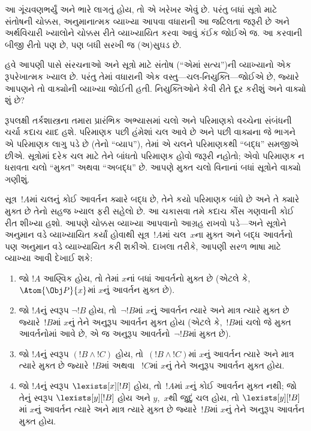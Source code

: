 આ ગૂંચવણભર્યું અને ભારે લાગતું હોય, તો એ ખરેખર એવું છે. પરંતુ બધાં
સૂત્રો માટે સંતોષની ચોક્કસ, અનુમાનાત્મક વ્યાખ્યા આપવા વધારાની આ
જટિલતા જરૂરી છે અને અર્થવિચારી ખ્યાલોને ચોક્કસ રીતે વ્યાખ્યાયિત કરવા
આવું કંઈક જોઈએ જ. આ કરવાની બીજી રીતો પણ છે, પણ બધી સરખી જ
(અ)સુઘડ છે.
\endgroup


\begingroup
\makeatletter{}\makeatother


\label{guunit:OLP-0144}


હવે આપણી પાસે સંરચનાઓ અને સૂત્રો માટે સંતોષ (``એમાં
સત્ય'')ની વ્યાખ્યાનો એક રૂપરેખાત્મક ખ્યાલ છે. પરંતુ તેમાં વધારાની એક
વસ્તુ---ચલ-નિયુક્તિ---જોઈએ છે, જ્યારે આપણને તો
વાક્યોની વ્યાખ્યા જોઈતી હતી. નિયુક્તિઓને કેવી રીતે દૂર કરીશું
અને વાક્યો શું છે?

રૂપલક્ષી તર્કશાસ્ત્રના તમારા પ્રારંભિક અભ્યાસમાં ચલો અને
પરિમાણકો વચ્ચેના સંબંધની ચર્ચા કદાચ યાદ હશે. પરિમાણક પછી હંમેશાં
ચલ આવે છે અને પછી વાક્યના જે ભાગને એ પરિમાણક લાગુ
પડે છે (તેનો ``વ્યાપ''), તેમાં એ ચલને પરિમાણકથી ``બદ્ધ''
સમજીએ છીએ. સૂત્રોમાં દરેક ચલ માટે તેને બાંધતો પરિમાણક
હોવો જરૂરી નહોતો; એવો પરિમાણક ન ધરાવતા ચલો ``મુક્ત'' અથવા
``અબદ્ધ'' છે. આપણે મુક્ત ચલો વિનાનાં બધાં સૂત્રોને
વાક્યો ગણીશું.

સૂત્ર~$!A$માં ચલનું કોઈ આવર્તન ક્યારે બદ્ધ છે, તેને
કયો પરિમાણક બાંધે છે અને તે ક્યારે મુક્ત છે તેનો સહજ ખ્યાલ ફરી સહેલો
છે. આ ચકાસવા તમે કદાચ કૌંસ ગણવાની કોઈ રીત શીખ્યા હશો. આપણે ચોક્કસ
વ્યાખ્યા આપવાનો આગ્રહ રાખવો પડે---અને સૂત્રોને અનુમાન વડે
વ્યાખ્યાયિત કર્યાં હોવાથી સૂત્ર~$!A$માં ચલ~$x$ના
મુક્ત અને બદ્ધ આવર્તનો પણ અનુમાન વડે વ્યાખ્યાયિત કરી શકીએ. દાખલા
તરીકે, આપણી સરળ ભાષા માટે વ્યાખ્યા આવી દેખાઈ શકે:
\begin{enumerate}
  \item જો $!A$ આણ્વિક હોય, તો તેમાં $x$નાં બધાં આવર્તનો મુક્ત છે
  (એટલે કે,~$\Atom{\Obj P}{x}$માં $x$નું આવર્તન મુક્ત છે).
  \item જો $!A$નું સ્વરૂપ $\lnot !B$ હોય, તો~$\lnot !B$માં $x$નું
  આવર્તન ત્યારે અને માત્ર ત્યારે મુક્ત છે જ્યારે~$!B$માં $x$નું તેને
  અનુરૂપ આવર્તન મુક્ત હોય (એટલે કે,~$!B$માં ચલો જે મુક્ત આવર્તનોમાં
  આવે છે, એ જ અનુરૂપ આવર્તનો~$\lnot !B$માં મુક્ત છે).
  \item જો $!A$નું સ્વરૂપ $(!B \land !C)$ હોય, તો~$(!B \land !C)$માં
  $x$નું આવર્તન ત્યારે અને માત્ર ત્યારે મુક્ત છે જ્યારે~$!B$માં અથવા
  ~$!C$માં $x$નું તેને અનુરૂપ આવર્તન મુક્ત હોય.
  \item જો $!A$નું સ્વરૂપ $\lexists[x][!B]$ હોય, તો~$!A$માં $x$નું
  કોઈ આવર્તન મુક્ત નથી; જો તેનું સ્વરૂપ $\lexists[y][!B]$ હોય અને
  $y$,~$x$થી જુદું ચલ હોય, તો $\lexists[y][!B]$માં $x$નું
  આવર્તન ત્યારે અને માત્ર ત્યારે મુક્ત છે જ્યારે~$!B$માં $x$નું તેને
  અનુરૂપ આવર્તન મુક્ત હોય.
\end{enumerate}

